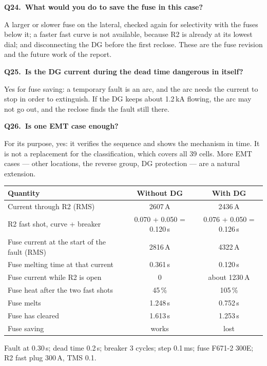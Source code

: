 \documentclass[11pt,a4paper]{article}
\newcommand{\sect}[1]{\needspace{8\baselineskip}\bigskip{\Large\color{navy}\bfseries #1}\par\smallskip{\color{navy}\hrule height 0.8pt}\smallskip}
\newcommand{\q}[2]{\par\needspace{4\baselineskip}\medskip\noindent\textbf{Q#1.\ #2}\par\noindent}
\newcommand{\hd}{\rowcolor{headc}}
\begin{document}
\q{24}{What would you do to save the fuse in this case?}
A larger or slower fuse on the lateral, checked again for selectivity with the fuses below it; a faster fast
curve is not available, because R2 is already at its lowest dial; and disconnecting the DG before the first
reclose. These are the fuse revision and the future work of the report.

\q{25}{Is the DG current during the dead time dangerous in itself?}
Yes for fuse saving: a temporary fault is an arc, and the arc needs the current to stop in order to
extinguish. If the DG keeps about 1.2\,kA flowing, the arc may not go out, and the reclose finds the fault
still there.

\q{26}{Is one EMT case enough?}
For its purpose, yes: it verifies the sequence and shows the mechanism in time. It is not a replacement for
the classification, which covers all 39 cells. More EMT cases --- other locations, the reverse group, DG
protection --- are a natural extension.

\sect{11. Numbers to remember}
\begin{table}[H]\centering\small
\begin{tabular}{|p{7.2cm}|c|c|}\hline
\hd \textbf{Quantity} & \textbf{Without DG} & \textbf{With DG} \\ \hline
Current through R2 (RMS) & 2607\,A & 2436\,A \\ \hline
R2 fast shot, curve + breaker & 0.070 + 0.050 = 0.120\,s & 0.076 + 0.050 = 0.126\,s \\ \hline
Fuse current at the start of the fault (RMS) & 2816\,A & 4322\,A \\ \hline
Fuse melting time at that current & 0.361\,s & 0.120\,s \\ \hline
Fuse current while R2 is open & 0 & about 1230\,A \\ \hline
Fuse heat after the two fast shots & 45\,\% & 105\,\% \\ \hline
Fuse melts & 1.248\,s & 0.752\,s \\ \hline
Fuse has cleared & 1.613\,s & 1.253\,s \\ \hline
Fuse saving & \cellcolor{okc}works & \cellcolor{noc}lost \\ \hline
\end{tabular}
\end{table}
Fault at 0.30\,s; dead time 0.2\,s; breaker 3 cycles; step 0.1\,ms; fuse F671-2 300E; R2 fast plug 300\,A,
TMS 0.1.
\end{document}
